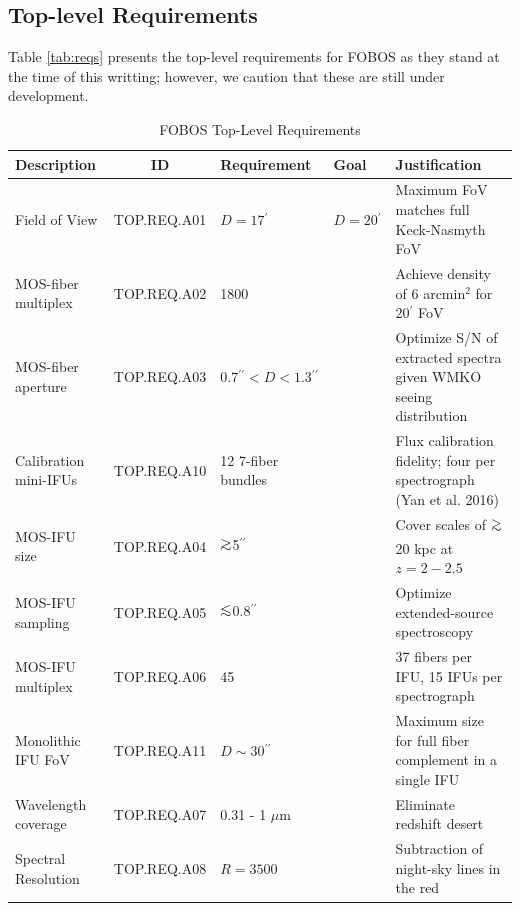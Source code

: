 \documentclass[oneside,11pt]{amsart}
\newcommand{\arcmin}{\mbox{$^{\prime}$}}
\newcommand{\arcsec}{\mbox{$^{\prime\prime}$}}
\DeclareRobustCommand{\gtrsim}{%
\mathrel{\hskip-.5em\begin{array}{c}>\\[-8pt]\sim\end{array}\hskip-.5em}}
\DeclareRobustCommand{\lesssim}{%
\mathrel{\hskip-.5em\begin{array}{c}<\\[-8pt]\sim\end{array}\hskip-.5em}}
\begin{document}

\subsection{Top-level Requirements}

Table \ref{tab:reqs} presents the top-level requirements for FOBOS as
they stand at the time of this writting; however, we caution that
these are still under development.

\begin{table}[h!]
\centering
\begin{threeparttable}
\caption{FOBOS Top-Level Requirements}
\footnotesize
\begin{tabular}{| l | c | p{2.5cm} | p{1.5cm} | p{4cm} |}
\hline
{\bf Description} & {\bf ID} & {\bf Requirement} & {\bf Goal} & {\bf Justification} \\
\hline
\hline
Field of View & TOP.REQ.A01 & $D=17\arcmin$ & $D=20\arcmin$ & Maximum FoV matches full Keck-Nasmyth FoV \\
\hline
MOS-fiber multiplex & TOP.REQ.A02 & 1800 &  & Achieve density of 6 arcmin$^2$ for $20\arcmin$ FoV \\
\hline
MOS-fiber aperture & TOP.REQ.A03 & $0.7\arcsec < D < 1.3\arcsec$ &  & Optimize S/N of extracted spectra given WMKO seeing distribution \\
\hline
Calibration mini-IFUs & TOP.REQ.A10 & 12 7-fiber bundles & & Flux calibration fidelity; four per spectrograph (Yan et al. 2016) \\
\hline
MOS-IFU size & TOP.REQ.A04 & $\gtrsim$5\arcsec &  & Cover scales of $\gtrsim$20 kpc at $z=2-2.5$ \\
\hline
MOS-IFU sampling & TOP.REQ.A05 & $\lesssim$0.8\arcsec & & Optimize extended-source spectroscopy \\
\hline
MOS-IFU multiplex & TOP.REQ.A06 & 45 & & 37 fibers per IFU, 15 IFUs per spectrograph \\
\hline
Monolithic IFU FoV & TOP.REQ.A11 & $D\sim$30\arcsec & & Maximum size for full fiber complement in a single IFU \\
Wavelength coverage & TOP.REQ.A07 & 0.31 - 1 $\mu$m & & Eliminate redshift desert \\
\hline
Spectral Resolution & TOP.REQ.A08 & $R = 3500$ & & Subtraction of night-sky lines in the red \\

\end{tabular}
\end{threeparttable}
\end{table}
\end{document}
